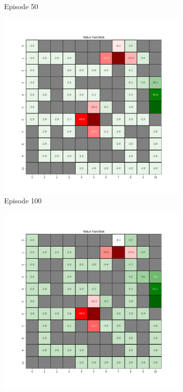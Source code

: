 \documentclass{assignment}
\begin{document}
\begin{figure}[H]
\begin{subfigure}{0.3\textwidth}
    \caption{Episode 50}
    \end{subfigure}\hfill
    \begin{subfigure}{0.3\textwidth}
        \includegraphics[width=\textwidth]{figures/value_td/gamma_sweep/value_function_alpha_0.1_gamma_0.5_epsilon_0.2_iteration_100.png}
    \caption{Episode 100}
    \end{subfigure}
    \begin{subfigure}{0.3\textwidth}
        \includegraphics[width=\textwidth]{figures/value_td/gamma_sweep/value_function_alpha_0.1_gamma_0.5_epsilon_0.2_iteration_1000.png}

\end{subfigure}
\end{figure}
\end{document}
